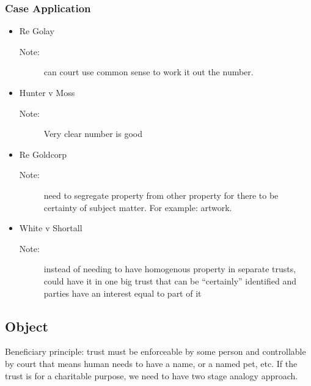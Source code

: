 \subsubsection*{Case Application}
\begin{itemize}
    \item Re Golay
        \begin{description}
            \item[Note:]can court use common sense to work it out the number. 
        \end{description}
    \item Hunter v Moss
        \begin{description}
            \item[Note:]Very clear number is good 
        \end{description}
    \item Re Goldcorp
        \begin{description}
            \item[Note:] need to segregate property from other property for there to be certainty of subject matter. For example: artwork.
        \end{description}
    \item White v Shortall
        \begin{description}
            \item[Note:] instead of needing to have homogenous property in separate trusts, could have it in one big trust that can be “certainly” identified and parties have an interest equal to part of it
        \end{description}
\end{itemize}

\subsection*{Object}
Beneficiary principle: trust must be enforceable by some person and controllable by court that means human needs to have a name, or a named pet, etc. If the trust is for a charitable purpose, we need to have two stage analogy approach.

